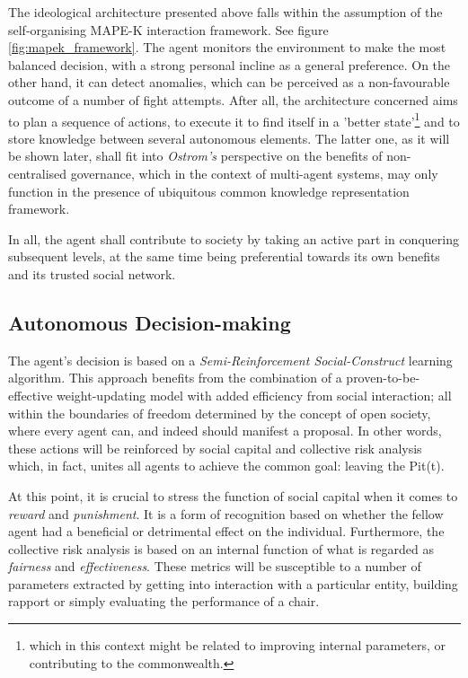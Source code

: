         The ideological architecture presented above falls within the assumption of the self-organising MAPE-K interaction framework\cite{mapek}. See figure \ref{fig:mapek_framework}. The agent monitors the environment to make the most balanced decision, with a strong personal incline as a general preference. On the other hand, it can detect anomalies, which can be perceived as a non-favourable outcome of a number of fight attempts. After all, the architecture concerned aims to plan a sequence of actions, to execute it to find itself in a 'better state'\footnote{which in this context might be related to improving internal parameters, or contributing to the commonwealth.} and to store knowledge between several autonomous elements. The latter one, as it will be shown later, shall fit into \textit{Ostrom's} perspective on the benefits of non-centralised governance, which in the context of multi-agent systems, may only function in the presence of ubiquitous common knowledge representation framework.

        In all, the agent shall contribute to society by taking an active part in conquering subsequent levels, at the same time being preferential towards its own benefits and its trusted social network.
        
        
    \subsection{Autonomous Decision-making}
        The agent's decision is based on a \textit{Semi-Reinforcement Social-Construct} learning algorithm. This approach benefits from the combination of a proven-to-be-effective weight-updating model with added efficiency from social interaction; all within the boundaries of freedom determined by the concept of open society, where every agent can, and indeed should manifest a proposal. In other words, these actions will be reinforced by social capital and collective risk analysis which, in fact, unites all agents to achieve the common goal: leaving the Pit(t).
        
        At this point, it is crucial to stress the function of social capital when it comes to \textit{reward} and \textit{punishment}. It is a form of recognition based on whether the fellow agent had a beneficial or detrimental effect on the individual. Furthermore, the collective risk analysis is based on an internal function of what is regarded as \textit{fairness} and \textit{effectiveness}. These metrics will be susceptible to a number of parameters extracted by getting into interaction with a particular entity, building rapport or simply evaluating the performance of a chair.
        

